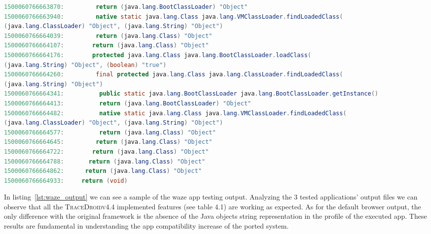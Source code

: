 \begin{listing}[!h]
\begin{adjustwidth}{-9em}{-9em}
\begin{lstlisting}[language=Java]
1500060766663870:         return (java.lang.BootClassLoader) "Object"
1500060766663940:         native static java.lang.Class java.lang.VMClassLoader.findLoadedClass(
(java.lang.ClassLoader) "Object", (java.lang.String) "Object")
1500060766664039:         return (java.lang.Class) "Object"
1500060766664107:        return (java.lang.Class) "Object"
1500060766664176:        protected java.lang.Class java.lang.BootClassLoader.loadClass(
(java.lang.String) "Object", (boolean) "true")
1500060766664260:         final protected java.lang.Class java.lang.ClassLoader.findLoadedClass(
(java.lang.String) "Object")
1500060766664341:          public static java.lang.BootClassLoader java.lang.BootClassLoader.getInstance()
1500060766664413:          return (java.lang.BootClassLoader) "Object"
1500060766664482:          native static java.lang.Class java.lang.VMClassLoader.findLoadedClass(
(java.lang.ClassLoader) "Object", (java.lang.String) "Object")
1500060766664577:          return (java.lang.Class) "Object"
1500060766664645:         return (java.lang.Class) "Object"
1500060766664722:        return (java.lang.Class) "Object"
1500060766664788:       return (java.lang.Class) "Object"
1500060766664862:      return (java.lang.Class) "Object"
1500060766664933:     return (void)
    \end{lstlisting}
  \end{adjustwidth}
\end{listing}

In listing~\ref{lst:waze_output} we can see a sample of the waze app testing
output. Analyzing the 3 tested applications' output files we can
observe that all the \textsc{TraceDroidv4.4} implemented features (see table 4.1)
are working as expected. As for the default browser output, the only
difference with the original framework is the absence of the Java
objects string representation in the profile of the executed
app. These results are fundamental in understanding the app
compatibility increase of the ported system.

